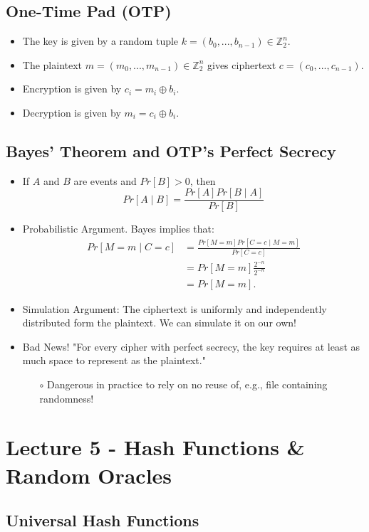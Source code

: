 \documentclass[a4paper]{scrartcl}
\begin{document}
\subsection*{One-Time Pad (OTP)}
\begin{itemize}
\item The key is given by a random tuple $k = (b_0, ..., b_{n-1}) \in \mathbb{Z}_{2}^{n}$.
\item The plaintext $m = (m_0, ..., m_{n-1}) \in \mathbb{Z}_{2}^{n}$ gives ciphertext $c = (c_0, ..., c_{n-1})$.
\item Encryption is given by $c_i = m_i \oplus b_i$.
\item Decryption is given by $m_i = c_i \oplus b_i$.
\end{itemize}

\subsection*{Bayes' Theorem and OTP's Perfect Secrecy}
\begin{itemize}
\item If $A$ and $B$ are events and $Pr[B] > 0$, then $$Pr[A \mid B] = \frac{Pr[A]Pr[B \mid A]}{Pr[B]}$$
\item Probabilistic Argument. Bayes implies that:
\begin{align*}
Pr[M = m \mid C = c] &= \frac{Pr[M = m]Pr[C = c \mid M = m]}{Pr[C=c]}\\
&=Pr[M = m]\frac{2^{-n}}{2^{-n}}\\
&=Pr[M=m].
\end{align*}
\item Simulation Argument: The ciphertext is uniformly and independently distributed form the plaintext. We can simulate it on our own!
\item Bad News! "For every cipher with perfect secrecy, the key requires at least as much space to represent as the plaintext."
\begin{itemize}
\item [$\circ$] Dangerous in practice to rely on no reuse of, e.g., file containing randomness!
\end{itemize}
\end{itemize}

\section*{Lecture 5 - Hash Functions \& Random Oracles}

\subsection*{Universal Hash Functions}
\end{document}
